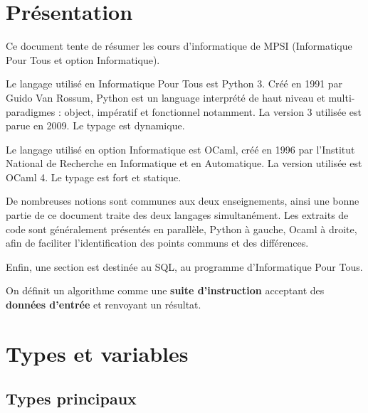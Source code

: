 \documentclass{hibiscus}
\begin{document}
\maketitle
\tableofcontents


\newpage \section{Présentation}

\par Ce document tente de résumer les cours d'informatique de MPSI (Informatique Pour Tous et option Informatique).

\medskip \par Le langage utilisé en Informatique Pour Tous est Python 3. Créé en 1991 par Guido Van Rossum, Python est un language interprété de haut niveau et multi-paradigmes : object, impératif et fonctionnel notamment. La version 3 utilisée est parue en 2009. Le typage est dynamique.

\medskip \par Le langage utilisé en option Informatique est OCaml, créé en 1996 par l'Institut National de Recherche en Informatique et en Automatique. La version utilisée est OCaml 4. Le typage est fort et statique.

\medskip \par De nombreuses notions sont communes aux deux enseignements, ainsi une bonne partie de ce document traite des deux langages simultanément. Les extraits de code sont généralement présentés en parallèle, Python à gauche, Ocaml à droite, afin de faciliter l'identification des points communs et des différences. 

\medskip \par Enfin, une section est destinée au SQL, au programme d'Informatique Pour Tous.

\medskip \par On définit un algorithme comme une \textbf{suite d'instruction} acceptant des \textbf{données d'entrée} et renvoyant un résultat.


\newpage \section{Types et variables}


\subsection{Types principaux}
\end{document}
